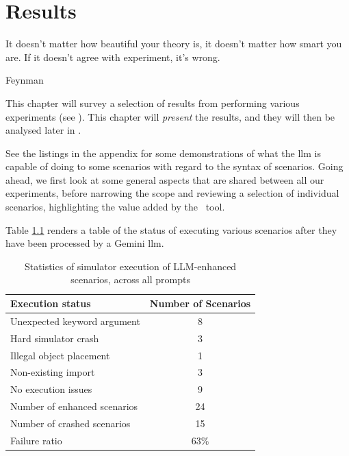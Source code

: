 \chapter{Results}\label{chp:results}

\epigraph{It doesn't matter how beautiful your theory is, it doesn't matter how smart you are. If it doesn't agree with experiment, it's wrong.}{Feynman}

This chapter will survey a selection of results from performing various experiments (see
). This chapter will \emph{present} the results, and they will then be
analysed later in .

See the listings in the  appendix for some demonstrations of what the
\acrshort{llm} is capable of doing to some scenarios with regard to the syntax of scenarios. Going
ahead, we first look at some general aspects that are shared between all our experiments, before
narrowing the scope and reviewing a selection of individual scenarios, highlighting the value added
by the \hefe~tool.

Table \ref{tab:scenarioFailures} renders a table of the status of executing various
scenarios after they have been processed by a Gemini \acrshort{llm}.

\begin{table}[htbp]
    \centering
    \caption{Statistics of simulator execution of LLM-enhanced scenarios, across all prompts}
    \begin{tabular}{l c}
        \toprule
        Execution status             & Number of Scenarios \\
        \midrule
        Unexpected keyword argument  & 8                   \\
        Hard simulator crash         & 3                   \\
        Illegal object placement     & 1                   \\
        Non-existing import          & 3                   \\
        \midrule
        No execution issues          & 9                   \\
        \midrule
        Number of enhanced scenarios & 24                  \\
        Number of crashed scenarios  & 15                  \\
        Failure ratio                & 63\%                \\
        \bottomrule
    \end{tabular}
    \label{tab:scenarioFailures}
\end{table}


